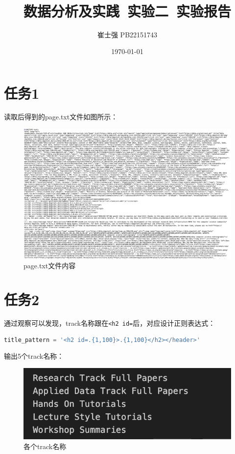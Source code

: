 \documentclass[UTF8]{ctexart}
\title{数据分析及实践\ 实验二\ 实验报告}
\author{崔士强 PB22151743}
\date{\today}
\begin{document}
\maketitle
\section*{任务1}
读取后得到的page.txt文件如图所示：
\begin{figure}[h]
  \centering
  \includegraphics[scale=0.2]{page.png}
  \caption{page.txt文件内容}
\end{figure}

\section*{任务2}
通过观察可以发现，track名称跟在\lstinline|<h2 id=|后，对应设计正则表达式：
\begin{lstlisting}[language=python]
  title_pattern = '<h2 id=.{1,100}>.{1,100}</h2></header>'
\end{lstlisting}

输出5个track名称：
\begin{figure}[h]
  \centering
  \includegraphics[scale=0.5]{tracks.png}
  \caption{各个track名称}
\end{figure}
\end{document}

